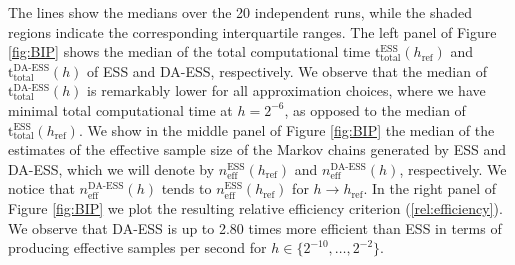 \documentclass[sn-mathphys-num]{sn-jnl}%
\theoremstyle{thmstyleone}%
\theoremstyle{thmstyletwo}%
\theoremstyle{thmstylethree}%
\newcommand{\change}[1]{\bgroup\color{black}#1\egroup}    %
\begin{document}




\change{The lines show the medians over the 20 independent runs, while the shaded regions indicate the corresponding interquartile ranges.} The left panel of Figure \ref{fig:BIP} shows the \change{median of the} total computational time $\mathrm{t}_{\mathrm{total}}^{\text{ESS}}(h_{\text{ref}})$ and $\mathrm{t}_{\mathrm{total}}^{\text{DA-ESS}}(h)$ of ESS and DA-ESS, respectively. We observe that \change{the median of} $\mathrm{t}_{\mathrm{total}}^{\text{DA-ESS}}(h)$ is \change{remarkably} lower for \change{all approximation choices}, where we have minimal total computational time at \change{$h=2^{-6}$}, as opposed to \change{the median of} $\mathrm{t}_{\mathrm{total}}^{\text{ESS}}(h_{\text{ref}})$. 
We show in the \change{middle} panel of Figure \ref{fig:BIP} \change{the median of the} estimates of the effective sample size of the Markov chains generated by ESS and DA-ESS, which we will denote by $n^{\text{ESS}}_{\mathrm{eff}}(h_{\text{ref}})$ and $n^{\text{DA-ESS}}_{\mathrm{eff}}(h)$, respectively. We notice that  $n^{\text{DA-ESS}}_{\mathrm{eff}}(h)$ tends to $n^{\text{ESS}}_{\mathrm{eff}}(h_{\text{ref}})$ for $h\to h_{\text{ref}}$. In the right panel of Figure \ref{fig:BIP} we plot the \change{resulting} relative efficiency criterion (\ref{rel:efficiency}). We observe that DA-ESS is up to \change{2.80} times more efficient than ESS in terms of producing effective samples per second for $h\in\{2^{-10},\dots,2^{-2}\}$. 
\end{document}

